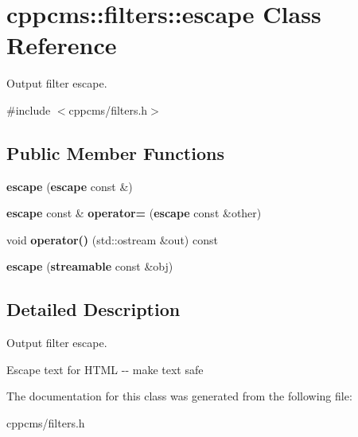 \section{cppcms\-:\-:filters\-:\-:escape \-Class \-Reference}
\label{classcppcms_1_1filters_1_1escape}


\-Output filter escape.  




{\ttfamily \#include $<$cppcms/filters.\-h$>$}

\subsection*{\-Public \-Member \-Functions}
\begin{DoxyCompactItemize}
\item 
{\bfseries escape} ({\bf escape} const \&)\label{classcppcms_1_1filters_1_1escape_ae128f6c05b231a7424fc2323c39c8a82}

\item 
{\bf escape} const \& {\bfseries operator=} ({\bf escape} const \&other)\label{classcppcms_1_1filters_1_1escape_abcb45f1775b294e902895e04400a33a1}

\item 
void {\bfseries operator()} (std\-::ostream \&out) const \label{classcppcms_1_1filters_1_1escape_ad3dc5ca2d4592d2aada15b8e69604ad1}

\item 
{\bfseries escape} ({\bf streamable} const \&obj)\label{classcppcms_1_1filters_1_1escape_a4995eb58124be3c31c09a3fcfa3599da}

\end{DoxyCompactItemize}


\subsection{\-Detailed \-Description}
\-Output filter escape. 

\-Escape text for \-H\-T\-M\-L -\/-\/ make text safe 

\-The documentation for this class was generated from the following file\-:\begin{DoxyCompactItemize}
\item 
cppcms/filters.\-h\end{DoxyCompactItemize}
